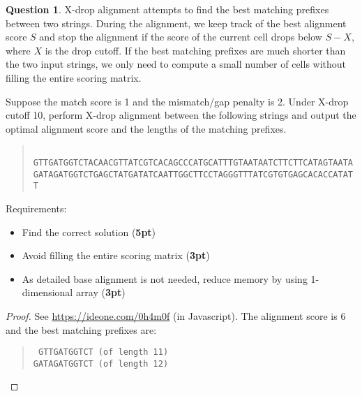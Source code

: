 \documentclass{article}[10pt]
\theoremstyle{definition}\newtheorem{question}{Question}
\begin{document}
\begin{question}
X-drop alignment attempts to find the best matching prefixes between two strings.
During the alignment, we keep track of the best alignment score $S$ and stop the alignment
if the score of the current cell drops below $S-X$, where $X$ is the drop cutoff.
If the best matching prefixes are much shorter than the two input strings,
we only need to compute a small number of cells without filling the entire scoring matrix.

Suppose the match score is 1 and the mismatch/gap penalty is 2.
Under X-drop cutoff 10, perform X-drop alignment between the following strings and
output the optimal alignment score and the lengths of the matching prefixes.
\begin{quote}
\footnotesize\tt
GTTGATGGTCTACAACGTTATCGTCACAGCCCATGCATTTGTAATAATCTTCTTCATAGTAATA\\
GATAGATGGTCTGAGCTATGATATCAATTGGCTTCCTAGGGTTTATCGTGTGAGCACACCATATT
\end{quote}
Requirements:
\begin{itemize}
\item Find the correct solution ({\bf 5pt})
\item Avoid filling the entire scoring matrix ({\bf 3pt})
\item As detailed base alignment is not needed, reduce memory by using 1-dimensional array ({\bf 3pt})
\end{itemize}
\end{question}

\begin{proof}
See \url{https://ideone.com/0h4m0f} (in Javascript).
The alignment score is 6 and the best matching prefixes are:
\begin{quote}
\footnotesize\tt
GTTGATGGTCT   (of length 11)\\
GATAGATGGTCT  (of length 12)
\end{quote}
\end{proof}
\end{document}
